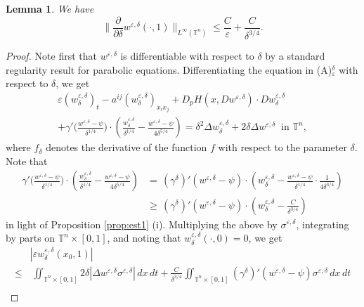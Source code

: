 \documentclass[12pt,reqno]{amsart}
\theoremstyle{plain}
\newtheorem{lem}[thm]{Lemma}
\theoremstyle{remark}
\numberwithin{equation}{section}
\begin{document}
\begin{lem}\label{lem:est3}
We have 
\[
\Big\|\frac{\partial}{{\partial}{\delta}}w^{{\varepsilon},{\delta}}(\cdot,1)\Big\|_{{L^{\infty}}({\mathbb{T}}^n)}\le \frac{C}{\varepsilon}+\frac{C}{{\delta}^{3/4}}. 
\]
\end{lem}
\begin{proof}
Note first that $w^{{\varepsilon},{\delta}}$ is differentiable with respect to ${\delta}$ by a standard regularity result for parabolic equations.   
Differentiating the equation in (A)$_{\varepsilon}^{\delta}$ with respect to 
${\delta}$, we get  
\begin{multline*}
\varepsilon (w^{\varepsilon,{\delta}}_{\delta})_t 
-a^{ij}(w_{\delta}^{\varepsilon,{\delta}})_{x_ix_j}+ D_p H(x,D w^{\varepsilon,{\delta}}) \cdot D w^{\varepsilon,{\delta}}_{\delta}\\
+{\gamma}'\Big(\frac{w^{\varepsilon,{\delta}}-\psi}{{\delta}^{1/4}}\Big)
\cdot\left(\frac{w^{\varepsilon,{\delta}}_{\delta}}{{\delta}^{1/4}}
-\frac{w^{\varepsilon,{\delta}}-\psi}{4{\delta}^{5/4}}\right)
= {\delta}^2\Delta w^{\varepsilon,{\delta}}_{\delta} 
+ 2{\delta}\Delta w^{\varepsilon,{\delta}} \ 
\text{ in } {\mathbb{T}}^n, 
\end{multline*}
where $f_{\delta}$ denotes the derivative of the function $f$ with respect 
to the parameter ${\delta}$. 
Note that
\begin{align*}
{\gamma}'\Big(\frac{w^{\varepsilon,{\delta}}-\psi}{{\delta}^{1/4}}\Big)
\cdot\left(\frac{w^{\varepsilon,{\delta}}_{\delta}}{{\delta}^{1/4}}
-\frac{w^{\varepsilon,{\delta}}-\psi}{4{\delta}^{5/4}}\right)
&=\, 
({\gamma}^{\delta})'(w^{\varepsilon,{\delta}}-\psi)
\cdot\left(w^{\varepsilon,{\delta}}_{\delta}
-\frac{w^{\varepsilon,{\delta}}-\psi}{{\delta}^{1/4}}\cdot\frac{1}{4{\delta}^{3/4}}
\right)\\
&\ge\,
({\gamma}^{\delta})'(w^{\varepsilon,{\delta}}-\psi)
\cdot\left(w^{\varepsilon,{\delta}}_{\delta}-\frac{C}{{\delta}^{3/4}}\right)
\end{align*}
in light of Proposition \ref{prop:est1} (i). 
Multiplying the above by $\sigma^{\varepsilon, {\delta}}$, integrating by parts on ${\mathbb{T}}^n\times[0,1]$,
and noting that $w^{{\varepsilon},{\delta}}_{\delta}(\cdot,0)=0$, we get 
\begin{align*}
&|\varepsilon w^{\varepsilon,{\delta}}_{\delta} (x_0,1)| \\
\le&\, 
\iint_{{\mathbb{T}}^n\times[0,1]}2{\delta}|\Delta w^{\varepsilon,{\delta}} \sigma^{\varepsilon, {\delta}}| \, dx \, dt
+\frac{C}{{\delta}^{3/4}}\iint_{{\mathbb{T}}^n\times[0,1]}({\gamma}^{\delta})'(w^{\varepsilon,{\delta}}-\psi){\sigma}^{{\varepsilon},{\delta}} \, dx \, dt\\

\end{align*}
\end{proof}
\end{document}
